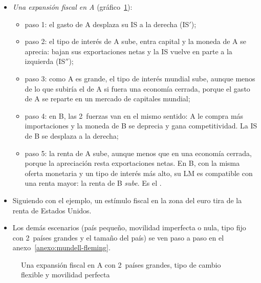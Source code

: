 \documentclass[11pt]{article}
\begin{document}
\begin{itemize}
\item \emph{Una expansión fiscal en A} (gráfico~\ref{fig:mundell-fleming-dos-paises-fiscal}):
  \begin{itemize}
  \item paso 1: el gasto de A desplaza su IS a la derecha (IS$'$);
  \item paso 2: el tipo de interés de A sube, entra capital y la moneda de A se aprecia: bajan sus exportaciones netas y la IS vuelve en parte a la izquierda (IS$''$);
  \item paso 3: como A es grande, el tipo de interés mundial sube, aunque menos de lo que subiría el de A si fuera una economía cerrada, porque el gasto de A se reparte en un mercado de capitales mundial;
  \item paso 4: en B, las 2~fuerzas van en el mismo sentido: A le compra más importaciones y la moneda de B se deprecia y gana competitividad. La IS de B se desplaza a la derecha;
  \item paso 5: la renta de A sube, aunque menos que en una economía cerrada, porque la apreciación resta exportaciones netas. En B, con la misma oferta monetaria y un tipo de interés más alto, su LM es compatible con una renta mayor: la renta de B \emph{sube}. Es el .
  \end{itemize}
\item Siguiendo con el ejemplo, un estímulo fiscal en la zona del euro tira de la renta de Estados Unidos.
\item Los demás escenarios (país pequeño, movilidad imperfecta o nula, tipo fijo con 2~países grandes y el tamaño del país) se ven paso a paso en el anexo~\ref{anexo:mundell-fleming}.
\end{itemize}

\begin{figure}[H]
\centering
\caption{Una expansión fiscal en A con 2~países grandes, tipo de cambio flexible y movilidad perfecta}\label{fig:mundell-fleming-dos-paises-fiscal}
\end{figure}
\end{document}
